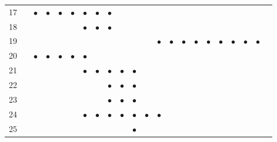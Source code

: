 \documentclass[text.tex]{subfiles}
\begin{document}
{\begin{center}
\begin{longtable}{l|ccccccccccccccccccccc}
17  &           & $\bullet$ & $\bullet$ & $\bullet$ & $\bullet$ & $\bullet$ & $\bullet$ & $\bullet$ &           &           &           &           &           &           &           &           &           &           &           &           &           \\
18  &           &           &           &           &           & $\bullet$ & $\bullet$ & $\bullet$ &           &           &           &           &           &           &           &           &           &           &           &           &           \\
19  &           &           &           &           &           &           &           &           &           &           &           & $\bullet$ & $\bullet$ & $\bullet$ & $\bullet$ & $\bullet$ & $\bullet$ & $\bullet$ & $\bullet$ & $\bullet$ &           \\
20  &           & $\bullet$ & $\bullet$ & $\bullet$ & $\bullet$ & $\bullet$ &           &           &           &           &           &           &           &           &           &           &           &           &           &           &           \\
21  &           &           &           &           &           & $\bullet$ & $\bullet$ & $\bullet$ & $\bullet$ & $\bullet$ &           &           &           &           &           &           &           &           &           &           &           \\
22  &           &           &           &           &           &           &           & $\bullet$ & $\bullet$ & $\bullet$ &           &           &           &           &           &           &           &           &           &           &           \\
23  &           &           &           &           &           &           &           & $\bullet$ & $\bullet$ & $\bullet$ &           &           &           &           &           &           &           &           &           &           &           \\
24  &           &           &           &           &           & $\bullet$ & $\bullet$ & $\bullet$ & $\bullet$ & $\bullet$ & $\bullet$ & $\bullet$ &           &           &           &           &           &           &           &           &           \\
25  &           &           &           &           &           &           &           &           &           & $\bullet$ &           &           &           &           &           &           &           &           &           &           &           \\

\end{longtable}
\end{center}}
\end{document}
